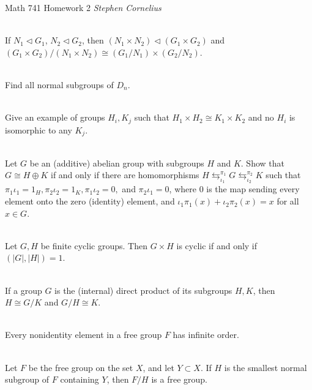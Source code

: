 \documentclass{article}
\begin{document}
\begin{center}
    Math 741
    \hfill Homework 2
    \hfill \textit{Stephen Cornelius}
\end{center}

\begin{problem}[Exercise 1.5.14] \\
    If $N_1 \triangleleft G_1$, $N_2 \triangleleft G_2$, then $(N_1 \times N_2) \triangleleft (G_1 \times G_2)$ and $(G_1 \times G_2)/(N_1 \times N_2) \cong (G_1/N_1) \times (G_2/N_2)$.
\end{problem}



\begin{problem}[1.6.11] \\ 
    Find all normal subgroups of $D_n$.
\end{problem}



\begin{problem}[1.8.2] \\ 
    Give an example of groups $H_i, K_j$ such that $H_1 \times H_2 \cong K_1 \times K_2$ and no $H_i$ is isomorphic to any $K_j$.
\end{problem}



\begin{problem}[1.8.3] \\ 
    Let $G$ be an (additive) abelian group with subgroups $H$ and $K$. Show that $G \cong H \oplus K$ if and only if there are homomorphisms $H \mathrel{\mathop{\leftrightarrows}^{{\pi_1}}_{\iota_1}} G \mathrel{\mathop{\leftrightarrows}^{{\pi_2}}_{\iota_2}} K$ such that $\pi_1\iota_1 = 1_H, \pi_2\iota_2 = 1_K, \pi_1\iota_2 = 0,$ and $\pi_2\iota_1 = 0$, where $0$ is the map sending every element onto the zero (identity) element, and $\iota_1\pi_1(x) + \iota_2\pi_2(x) = x$ for all $x \in G$.
\end{problem}




\begin{problem}[1.8.5] \\ 
    Let $G, H$ be finite cyclic groups. Then $G \times H$ is cyclic if and only if $(|G|,|H|) = 1$.
\end{problem}



\begin{problem}[1.8.9] \\ 
    If a group $G$ is the (internal) direct product of its subgroups $H, K$, then $H \cong G/K$ and $G/H \cong K$.
\end{problem}




\begin{problem}[1.9.1] \\ 
    Every nonidentity element in a free group $F$ has infinite order.
\end{problem}




\begin{problem}[1.9.4] \\ 
    Let $F$ be the free group on the set $X$, and let $Y \subset X$. If $H$ is the smallest normal subgroup of $F$ containing $Y$, then $F/H$ is a free group.
\end{problem}
\end{document}

